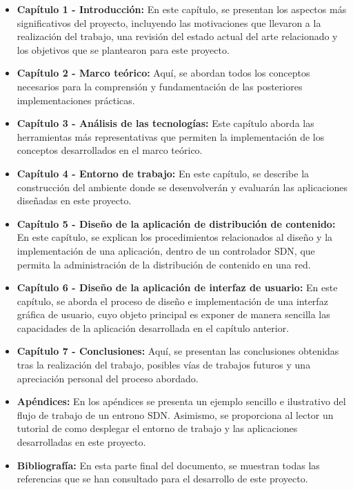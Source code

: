 \begin{itemize}
    \item \textbf{Capítulo 1 - Introducción:} En este capítulo, se presentan los aspectos más significativos del proyecto, incluyendo las motivaciones que llevaron a la realización del trabajo, una revisión del estado actual del arte relacionado y los objetivos que se plantearon para este proyecto.   
    \item \textbf{Capítulo 2 - Marco teórico:} Aquí, se abordan todos los conceptos necesarios para la comprensión y fundamentación de las posteriores implementaciones prácticas.
    \item \textbf{Capítulo 3 - Análisis de las tecnologías:} Este capítulo aborda las herramientas más representativas que permiten la implementación de los conceptos desarrollados en el marco teórico.
    \item \textbf{Capítulo 4 - Entorno de trabajo:} En este capítulo, se describe la construcción del ambiente donde se desenvolverán y evaluarán las aplicaciones diseñadas en este proyecto.
    \item \textbf{Capítulo 5 - Diseño de la aplicación de distribución de contenido:} En este capítulo, se explican los procedimientos relacionados al diseño y la implementación de una aplicación, dentro de un controlador SDN, que permita la administración de la distribución de contenido en una red.
    \item \textbf{Capítulo 6 - Diseño de la aplicación de interfaz de usuario:} En este capítulo, se aborda el proceso de diseño e implementación de una interfaz gráfica de usuario, cuyo objeto principal es exponer de manera sencilla las capacidades de la aplicación desarrollada en el capítulo anterior.
    \item \textbf{Capítulo 7 - Conclusiones:} Aquí, se presentan las conclusiones obtenidas tras la realización del trabajo, posibles vías de trabajos futuros y una apreciación personal del proceso abordado.
    \item \textbf{Apéndices:} En los apéndices se presenta un ejemplo sencillo e ilustrativo del flujo de trabajo de un entrono SDN. Asimismo, se proporciona al lector un tutorial de como desplegar el entorno de trabajo y las aplicaciones desarrolladas en este proyecto.    
    \item \textbf{Bibliografía:} En esta parte final del documento, se muestran todas las referencias que se han consultado para el desarrollo de este proyecto.   
\end{itemize}
